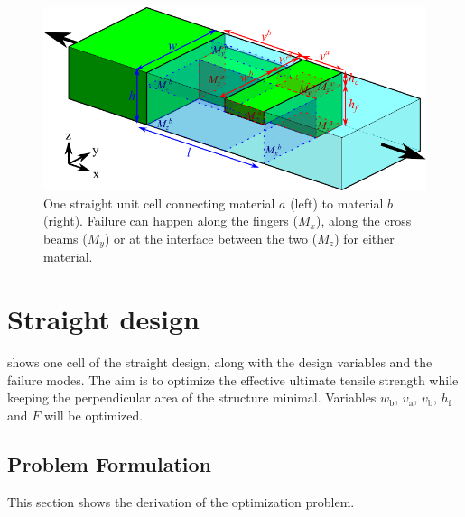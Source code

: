 
\newcommand{\hc}{h_\text{c}}
\newcommand{\hf}{h_\text{f}}
\newcommand{\wa}{w_\text{a}}
\newcommand{\wb}{w_\text{b}}
\newcommand{\va}{v_\text{a}}
\newcommand{\vb}{v_\text{b}}
\newcommand{\hmin}{h_\text{min}}
\newcommand{\wmin}{w_\text{min}}
\newcommand{\Lmax}{L_\text{max}}

\newcommand{\sigmafail}{\sigma_\text{y}}
\newcommand{\sigmafailz}{\sigma_\text{yZ}}
\newcommand{\taufail}{\tau_\text{y}}
\newcommand{\tauz}{\tau_\text{yZ}}


\newcommand{\gwb}{g_\text{1}}
\newcommand{\gva}{g_\text{2a}}
\newcommand{\gvb}{g_\text{2b}}
\newcommand{\ghf}{g_\text{3}}
\newcommand{\gd}{g_\text{4}}
\newcommand{\gta}{g_\text{5a}}
\newcommand{\gtb}{g_\text{5b}}
\newcommand{\gca}{g_\text{6}}
\newcommand{\gzb}{g_\text{7}}


\begin{figure}[H]
	\centering
	\includegraphics[width=\columnwidth]{sources/method/straight_model_v3.pdf}
	\caption{
		One straight unit cell connecting material $a$ (left) to material $b$ (right).
		Failure can happen along the fingers ($M_x$), along the cross beams ($M_y$) or at the interface between the two ($M_z$) for either material.}
	\label{fig:failure_modes}
\end{figure}


\section{Straight design}



 shows one cell of the straight design, along with the design variables and the failure modes.
The aim is to optimize the effective ultimate tensile strength while keeping the perpendicular area of the structure minimal. Variables $\wb$, $\va$, $\vb$, $\hf$ and $F$ will be optimized.


\subsection{Problem Formulation}
This section shows the derivation of the optimization problem. 

